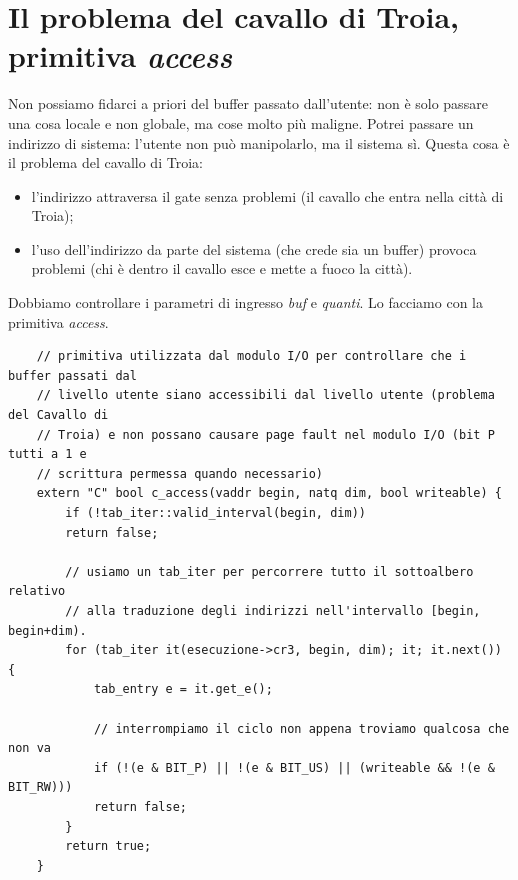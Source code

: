 \section{Il problema del cavallo di Troia, primitiva \emph{access}}
Non possiamo fidarci a priori del buffer passato dall'utente: non è solo passare una cosa locale e non globale, ma cose molto più maligne. Potrei passare un indirizzo di sistema: l'utente non può manipolarlo, ma il sistema sì. Questa cosa è il {problema del cavallo di Troia}:
\begin{itemize}
	\item l'indirizzo attraversa il gate senza problemi (il cavallo che entra nella città di Troia);
	\item l'uso dell'indirizzo da parte del sistema (che crede sia un buffer) provoca problemi (chi è dentro il cavallo esce e mette a fuoco la città).
\end{itemize}
Dobbiamo controllare i parametri di ingresso \emph{buf} e \emph{quanti}. Lo facciamo con la primitiva \emph{access}.
\small 
\begin{verbatim}
	// primitiva utilizzata dal modulo I/O per controllare che i buffer passati dal
	// livello utente siano accessibili dal livello utente (problema del Cavallo di
	// Troia) e non possano causare page fault nel modulo I/O (bit P tutti a 1 e
	// scrittura permessa quando necessario)
	extern "C" bool c_access(vaddr begin, natq dim, bool writeable) {
		if (!tab_iter::valid_interval(begin, dim))
		return false;
		
		// usiamo un tab_iter per percorrere tutto il sottoalbero relativo
		// alla traduzione degli indirizzi nell'intervallo [begin, begin+dim).
		for (tab_iter it(esecuzione->cr3, begin, dim); it; it.next()) {
			tab_entry e = it.get_e();
			
			// interrompiamo il ciclo non appena troviamo qualcosa che non va
			if (!(e & BIT_P) || !(e & BIT_US) || (writeable && !(e & BIT_RW)))
			return false;
		}
		return true;
	}
\end{verbatim}
\normalsize 

